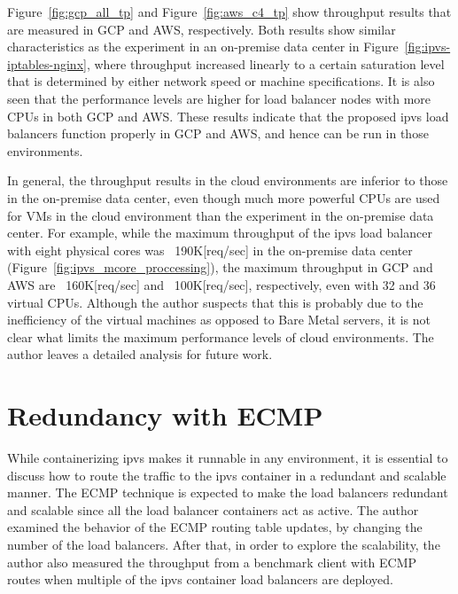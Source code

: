 Figure~\ref{fig:gcp_all_tp} and Figure~\ref{fig:aws_c4_tp} show throughput results that are measured in GCP and AWS, respectively. 
Both results show similar characteristics as the experiment in an on-premise data center in Figure~\ref{fig:ipvs-iptables-nginx}, where throughput increased linearly to a certain saturation level that is determined by either network speed or machine specifications.
It is also seen that the performance levels are higher for load balancer nodes with more CPUs in both GCP and AWS. 
These results indicate that the proposed ipvs load balancers function properly in GCP and AWS, and hence can be run in those environments.

In general, the throughput results in the cloud environments are inferior to those in the on-premise data center, even though much more powerful CPUs are used for VMs in the cloud environment than the experiment in the on-premise data center.
For example, while the maximum throughput of the ipvs load balancer with eight physical cores was ~190K[req/sec] in the on-premise data center (Figure~\ref{fig:ipvs_mcore_proccessing}), the maximum throughput in GCP and AWS are ~160K[req/sec] and ~100K[req/sec], respectively, even with 32 and 36 virtual CPUs.
Although the author suspects that this is probably due to the inefficiency of the virtual machines as opposed to Bare Metal servers,
it is not clear what limits the maximum performance levels of cloud environments. 
The author leaves a detailed analysis for future work.



\FloatBarrier

\section{Redundancy with ECMP}

While containerizing ipvs makes it runnable in any environment, it is essential to discuss how to route the traffic to the ipvs container in a redundant and scalable manner.
The ECMP technique is expected to make the load balancers redundant and scalable since all the load balancer containers act as active.
The author examined the behavior of the ECMP routing table updates, by changing the number of the load balancers.
After that, in order to explore the scalability, the author also measured the throughput from a benchmark client with ECMP routes when multiple of the ipvs container load balancers are deployed.

